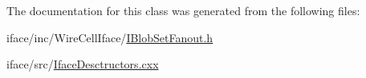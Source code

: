 The documentation for this class was generated from the following files\+:\begin{DoxyCompactItemize}
\item 
iface/inc/\+Wire\+Cell\+Iface/\hyperlink{_i_blob_set_fanout_8h}{I\+Blob\+Set\+Fanout.\+h}\item 
iface/src/\hyperlink{_iface_desctructors_8cxx}{Iface\+Desctructors.\+cxx}\end{DoxyCompactItemize}
